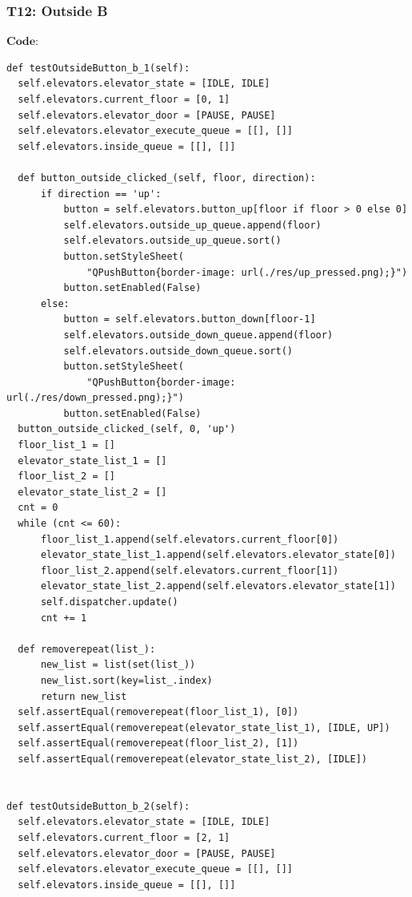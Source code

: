 \documentclass{article}
\begin{document}
\subsubsection*{T12: Outside B}
$\textbf{Code:}$
\begin{lstlisting}
def testOutsideButton_b_1(self):
  self.elevators.elevator_state = [IDLE, IDLE]
  self.elevators.current_floor = [0, 1]
  self.elevators.elevator_door = [PAUSE, PAUSE]
  self.elevators.elevator_execute_queue = [[], []]
  self.elevators.inside_queue = [[], []]

  def button_outside_clicked_(self, floor, direction):
      if direction == 'up':
          button = self.elevators.button_up[floor if floor > 0 else 0]
          self.elevators.outside_up_queue.append(floor)
          self.elevators.outside_up_queue.sort()
          button.setStyleSheet(
              "QPushButton{border-image: url(./res/up_pressed.png);}")
          button.setEnabled(False)
      else:
          button = self.elevators.button_down[floor-1]
          self.elevators.outside_down_queue.append(floor)
          self.elevators.outside_down_queue.sort()
          button.setStyleSheet(
              "QPushButton{border-image: url(./res/down_pressed.png);}")
          button.setEnabled(False)
  button_outside_clicked_(self, 0, 'up')
  floor_list_1 = []
  elevator_state_list_1 = []
  floor_list_2 = []
  elevator_state_list_2 = []
  cnt = 0
  while (cnt <= 60):
      floor_list_1.append(self.elevators.current_floor[0])
      elevator_state_list_1.append(self.elevators.elevator_state[0])
      floor_list_2.append(self.elevators.current_floor[1])
      elevator_state_list_2.append(self.elevators.elevator_state[1])
      self.dispatcher.update()
      cnt += 1

  def removerepeat(list_):
      new_list = list(set(list_))
      new_list.sort(key=list_.index)
      return new_list
  self.assertEqual(removerepeat(floor_list_1), [0])
  self.assertEqual(removerepeat(elevator_state_list_1), [IDLE, UP])
  self.assertEqual(removerepeat(floor_list_2), [1])
  self.assertEqual(removerepeat(elevator_state_list_2), [IDLE])


def testOutsideButton_b_2(self):
  self.elevators.elevator_state = [IDLE, IDLE]
  self.elevators.current_floor = [2, 1]
  self.elevators.elevator_door = [PAUSE, PAUSE]
  self.elevators.elevator_execute_queue = [[], []]
  self.elevators.inside_queue = [[], []]


\end{lstlisting}
\end{document}
